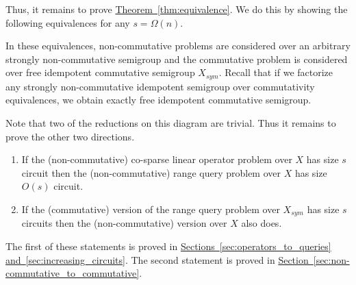 \documentclass[11pt]{article}
\numberwithin{equation}{section}
\theoremstyle{definition}
\theoremstyle{plain}
\newcommand{\expref}[2]{\hyperref[#2]{#1~\ref{#2}}}
\theoremstyle{plain}\newtheorem{observation}[theorem]{Observation}
\begin{document}
Thus, it remains to prove \expref{Theorem}{thm:equivalence}. We do this by showing
the following equivalences for any $s = \Omega(n)$.

\vspace{2mm}
\begin{center}
\end{center}
\vspace{2mm}

In these equivalences, non-commutative problems are considered over an arbitrary
strongly non-commutative semigroup and the commutative problem is considered
over free idempotent commutative semigroup $X_{sym}$. Recall that
if we factorize any strongly non-commutative idempotent semigroup over
commutativity equivalences, we obtain exactly free idempotent commutative
semigroup.

Note that two of the reductions on this diagram are trivial. Thus it remains to prove the other two directions.

%
%
%
%
%
%


\begin{enumerate}
	\item If the (non-commutative)
    co-sparse
    linear operator problem over $X$ has size $s$
	circuit then the (non-commutative)
	range query
	problem over $X$ has size
	$O(s)$ circuit.
	\item If the (commutative) version of the
	range query
	problem over $X_{sym}$ has
	size $s$ circuits then the (non-commutative) version over $X$ also does.
\end{enumerate}

The first of these statements is proved in \expref{Sections}{sec:operators_to_queries} \expref{and}{sec:increasing_circuits}.
The second statement is proved in \expref{Section}{sec:non-commutative_to_commutative}.
\end{document}

